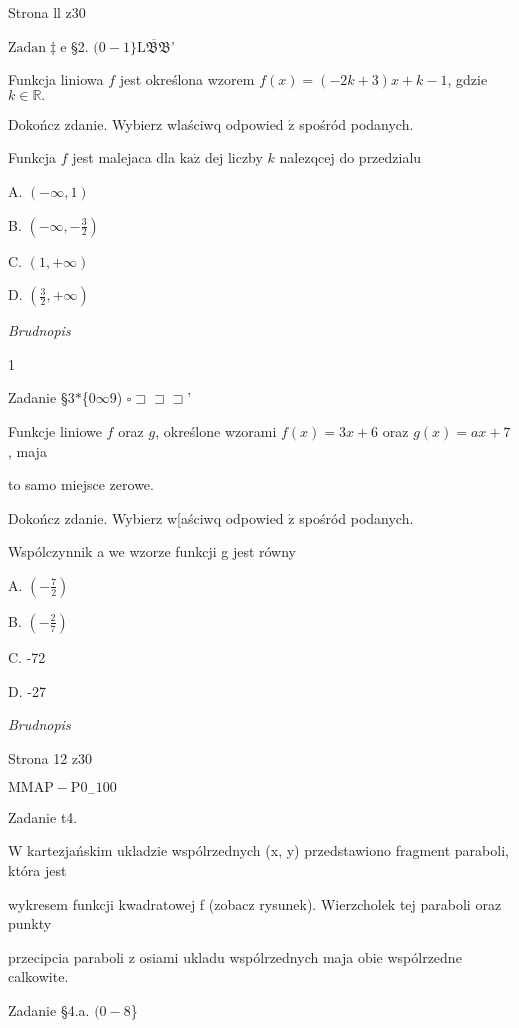 \documentclass[a4paper,12pt]{article}
\begin{document}
Strona ll z30





$\mathrm{Z}\mathrm{a}\mathrm{d}\mathrm{a}\mathrm{n}\ddagger \mathrm{e}$ \S 2. $(0-1\} \overline{\mathrm{L}\mathfrak{B}\mathfrak{B}}$'

Funkcja liniowa $f$ jest określona wzorem $f(x)=(-2k+3)x+k-1$, gdzie $k\in \mathbb{R}.$

Dokończ zdanie. Wybierz wlaściwq odpowied $\acute{\mathrm{z}}$ spośród podanych.

Funkcja $f$ jest malejaca dla $\mathrm{k}\mathrm{a}\dot{\mathrm{z}}$ dej liczby $k$ nalezqcej do przedzialu

A. $(-\infty,1)$

B. $(-\displaystyle \infty,-\frac{3}{2})$

C. $(1,+\infty)$

D. $(\displaystyle \frac{3}{2},+\infty)$

{\it Brudnopis}

1

Zadanie \S 3$*$\{0$\infty$9) $\square \sqsupset\sqsupset\sqsupset$'

Funkcje liniowe $f$ oraz $g$, określone wzorami $f(x)=3x+6$ oraz $g(x)=ax+7$, maja

to samo miejsce zerowe.

Dokończ zdanie. Wybierz w[aściwq odpowied $\acute{\mathrm{z}}$ spośród podanych.

Wspólczynnik a we wzorze funkcji g jest równy

A. $(-\displaystyle \frac{7}{2})$

B. $(-\displaystyle \frac{2}{7})$

C. -72

D. -27

{\it Brudnopis}

Strona 12 z30

$\mathrm{M}\mathrm{M}\mathrm{A}\mathrm{P}-\mathrm{P}0_{-}100$





Zadanie t4.

W kartezjańskim ukladzie wspólrzednych (x, y) przedstawiono fragment paraboli, która jest

wykresem funkcji kwadratowej f (zobacz rysunek). Wierzcholek tej paraboli oraz punkty

przecipcia paraboli z osiami ukladu wspólrzednych maja obie wspólrzedne calkowite.

Zadanie \S 4.a. $(0-8$\}
\end{document}
